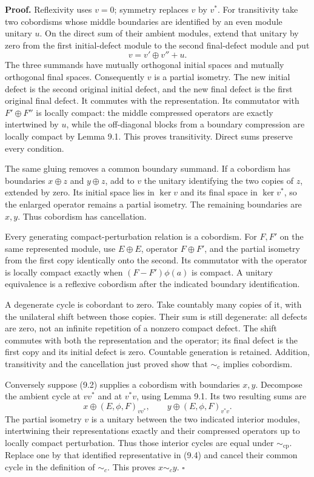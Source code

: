 \documentclass[
  11pt,
]{article}
\begin{document}
\textbf{Proof.} Reflexivity uses \(v=0\); symmetry replaces \(v\) by
\(v^*\). For transitivity take two cobordisms whose middle boundaries
are identified by an even module unitary \(u\). On the direct sum of
their ambient modules, extend that unitary by zero from the first
initial-defect module to the second final-defect module and put \[
v=v'\oplus v''+u.
\tag{9.3}
\] The three summands have mutually orthogonal initial spaces and
mutually orthogonal final spaces. Consequently \(v\) is a partial
isometry. The new initial defect is the second original initial defect,
and the new final defect is the first original final defect. It commutes
with the representation. Its commutator with \(F'\oplus F''\) is locally
compact: the middle compressed operators are exactly intertwined by
\(u\), while the off-diagonal blocks from a boundary compression are
locally compact by Lemma 9.1. This proves transitivity. Direct sums
preserve every condition.

The same gluing removes a common boundary summand. If a cobordism has
boundaries \(x\oplus z\) and \(y\oplus z\), add to \(v\) the unitary
identifying the two copies of \(z\), extended by zero. Its initial space
lies in \(\ker v\) and its final space in \(\ker v^*\), so the enlarged
operator remains a partial isometry. The remaining boundaries are
\(x,y\). Thus cobordism has cancellation.

Every generating compact-perturbation relation is a cobordism. For
\(F,F'\) on the same represented module, use \(E\oplus E\), operator
\(F\oplus F'\), and the partial isometry from the first copy identically
onto the second. Its commutator with the operator is locally compact
exactly when \((F-F')\phi(a)\) is compact. A unitary equivalence is a
reflexive cobordism after the indicated boundary identification.

A degenerate cycle is cobordant to zero. Take countably many copies of
it, with the unilateral shift between those copies. Their sum is still
degenerate: all defects are zero, not an infinite repetition of a
nonzero compact defect. The shift commutes with both the representation
and the operator; its final defect is the first copy and its initial
defect is zero. Countable generation is retained. Addition, transitivity
and the cancellation just proved show that \(\sim_c\) implies cobordism.

Conversely suppose (9.2) supplies a cobordism with boundaries \(x,y\).
Decompose the ambient cycle at \(vv^*\) and at \(v^*v\), using Lemma
9.1. Its two resulting sums are \[
x\oplus(E,\phi,F)_{vv^*},
\qquad
y\oplus(E,\phi,F)_{v^*v}.
\tag{9.4}
\] The partial isometry \(v\) is a unitary between the two indicated
interior modules, intertwining their representations exactly and their
compressed operators up to locally compact perturbation. Thus those
interior cycles are equal under \(\sim_{\mathrm{cp}}\). Replace one by
that identified representative in (9.4) and cancel their common cycle in
the definition of \(\sim_c\). This proves \(x\sim_c y\). \(\square\)
\end{document}
